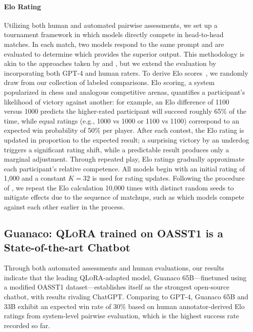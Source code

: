 \paragraph{Elo Rating} Utilizing both human and automated pairwise assessments, we set up a tournament framework in which models directly compete in head-to-head matches. In each match, two models respond to the same prompt and are evaluated to determine which provides the superior output. This methodology is akin to the approaches taken by \citet{bai2022training} and \citet{vicuna2023}, but we extend the evaluation by incorporating both GPT-4 and human raters. To derive Elo scores~\citep{elo1967proposed,elo1978rating}, we randomly draw from our collection of labeled comparisons. Elo scoring, a system popularized in chess and analogous competitive arenas, quantifies a participant's likelihood of victory against another: for example, an Elo difference of 1100 versus 1000 predicts the higher-rated participant will succeed roughly 65\% of the time, while equal ratings (e.g., 1000 vs 1000 or 1100 vs 1100) correspond to an expected win probability of 50\% per player. After each contest, the Elo rating is updated in proportion to the expected result; a surprising victory by an underdog triggers a significant rating shift, while a predictable result produces only a marginal adjustment. Through repeated play, Elo ratings gradually approximate each participant's relative competence. All models begin with an initial rating of 1,000 and a constant $K=32$ is used for rating updates. Following the procedure of \citet{vicuna2023}, we repeat the Elo calculation 10,000 times with distinct random seeds to mitigate effects due to the sequence of matchups, such as which models compete against each other earlier in the process.

\subsection{\textbf{Guanaco}: \textsc{QLoRA} trained on OASST1 is a State-of-the-art Chatbot} 

Through both automated assessments and human evaluations, our results indicate that the leading \textsc{QLoRA}-adapted model, {Guanaco} 65B—finetuned using a modified OASST1 dataset—establishes itself as the strongest open-source chatbot, with results rivaling ChatGPT. Comparing to GPT-4, {Guanaco} 65B and 33B exhibit an expected win rate of 30\% based on human annotator-derived Elo ratings from system-level pairwise evaluation, which is the highest success rate recorded so far.

